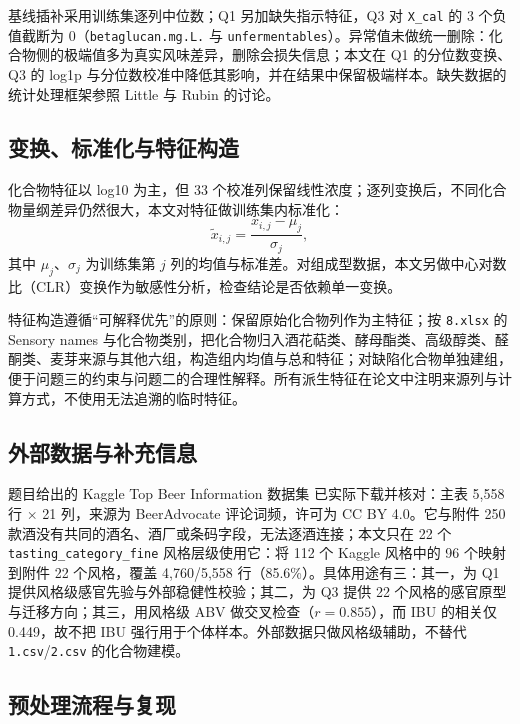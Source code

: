 基线插补采用训练集逐列中位数；Q1 另加缺失指示特征，Q3 对 \texttt{X\_cal} 的 3 个负值截断为 0（\texttt{betaglucan.mg.L.} 与 \texttt{unfermentables}）。异常值未做统一删除：化合物侧的极端值多为真实风味差异，删除会损失信息；本文在 Q1 的分位数变换、Q3 的 log1p 与分位数校准中降低其影响，并在结果中保留极端样本。缺失数据的统计处理框架参照 Little 与 Rubin 的讨论\citep{little2019statistical}。

\subsection{变换、标准化与特征构造}

化合物特征以 log10 为主，但 33 个校准列保留线性浓度；逐列变换后，不同化合物量纲差异仍然很大，本文对特征做训练集内标准化：
\begin{equation}
  \tilde{x}_{i,j}=\frac{x_{i,j}-\mu_j}{\sigma_j},
  \label{eq:standardize}
\end{equation}
其中 $\mu_j$、$\sigma_j$ 为训练集第 $j$ 列的均值与标准差。对组成型数据，本文另做中心对数比（CLR）变换作为敏感性分析，检查结论是否依赖单一变换。

特征构造遵循“可解释优先”的原则：保留原始化合物列作为主特征；按 \texttt{8.xlsx} 的 Sensory names 与化合物类别，把化合物归入酒花萜类、酵母酯类、高级醇类、醛酮类、麦芽来源与其他六组，构造组内均值与总和特征；对缺陷化合物单独建组，便于问题三的约束与问题二的合理性解释。所有派生特征在论文中注明来源列与计算方式，不使用无法追溯的临时特征。

\subsection{外部数据与补充信息}

题目给出的 Kaggle Top Beer Information 数据集\citep{kaggle2026topbeer} 已实际下载并核对：主表 5,558 行 $\times$ 21 列，来源为 BeerAdvocate 评论词频，许可为 CC BY 4.0。它与附件 250 款酒没有共同的酒名、酒厂或条码字段，无法逐酒连接；本文只在 22 个 \texttt{tasting\_category\_fine} 风格层级使用它：将 112 个 Kaggle 风格中的 96 个映射到附件 22 个风格，覆盖 4,760/5,558 行（85.6\%）。具体用途有三：其一，为 Q1 提供风格级感官先验与外部稳健性校验；其二，为 Q3 提供 22 个风格的感官原型与迁移方向；其三，用风格级 ABV 做交叉检查（$r=0.855$），而 IBU 的相关仅 0.449，故不把 IBU 强行用于个体样本。外部数据只做风格级辅助，不替代 \texttt{1.csv}/\texttt{2.csv} 的化合物建模。

\subsection{预处理流程与复现}

